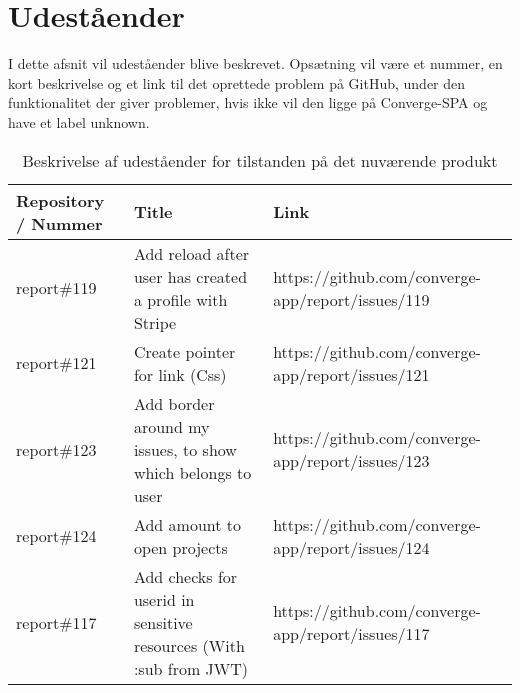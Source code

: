 \chapter{Udeståender}

I dette afsnit vil udeståender blive beskrevet. Opsætning vil være et nummer, en kort beskrivelse og et link til det oprettede problem på GitHub, under den funktionalitet der giver problemer, hvis ikke vil den ligge på Converge-SPA og have et label unknown.

\begin{table}[H]
\centering
\begin{tabular}[c]{p{2cm}|p{5cm}|p{5cm}}
\textbf{Repository / Nummer} & \textbf{Title}                                                            & \textbf{Link}                                             \\\hline
report\#119       & \multicolumn{1}{p{4cm}|}{Add reload after user has created a profile with Stripe}           & \multicolumn{1}{p{5cm}}{https://github.com/converge-app/report/issues/119} \\\hline
report\#121       & \multicolumn{1}{p{4cm}|}{Create pointer for link (Css)}                                     & \multicolumn{1}{p{5cm}}{https://github.com/converge-app/report/issues/121} \\\hline
report\#123       & \multicolumn{1}{p{4cm}|}{Add border around my issues, to show which belongs to user}        & \multicolumn{1}{p{5cm}}{https://github.com/converge-app/report/issues/123} \\\hline
report\#124       & \multicolumn{1}{p{4cm}|}{Add amount to open projects}                                       & \multicolumn{1}{p{5cm}}{https://github.com/converge-app/report/issues/124} \\\hline
report\#117       & \multicolumn{1}{p{4cm}|}{Add checks for userid in sensitive resources (With :sub from JWT)} & \multicolumn{1}{p{5cm}}{https://github.com/converge-app/report/issues/117}
\end{tabular}
\caption{Beskrivelse af udeståender for tilstanden på det nuværende produkt}
\label{tab:bugs}
\end{table}
